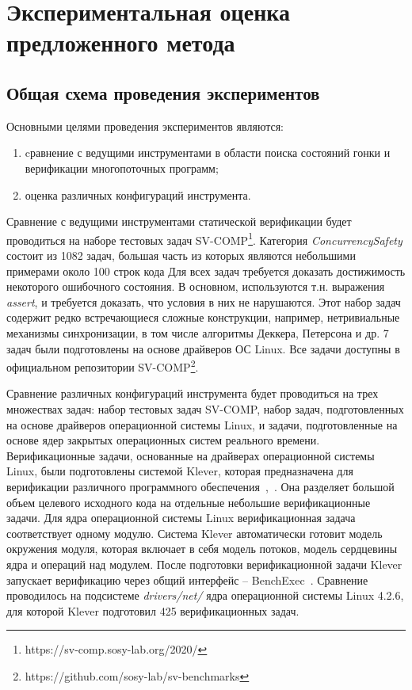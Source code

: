 \chapter{Экспериментальная оценка предложенного метода}
\label{chapter_evaluation}

\newcommand{\theory}{CPALockator-Reach}
\newcommand{\theoryraces}{CPALockator-TM}
\newcommand{\combatmode}{CPALockator-Inv}

\section{Общая схема проведения экспериментов}

Основными целями проведения экспериментов являются:
\begin{enumerate}
\item cравнение с ведущими инструментами в области поиска состояний гонки и верификации многопоточных программ;
\item оценка различных конфигураций инструмента.
\end{enumerate}

Сравнение с ведущими инструментами статической верификации будет проводиться на наборе тестовых задач SV-COMP\footnote{https://sv-comp.sosy-lab.org/2020/}.
Категория {\em ConcurrencySafety} состоит из 1082 задач, большая часть из которых являются небольшими примерами около 100 строк кода
Для всех задач требуется доказать достижимость некоторого ошибочного состояния. 
В основном, используются т.н. выражения \textit{assert}, и требуется доказать, что условия в них не нарушаются. 
Этот набор задач содержит редко встречающиеся сложные конструкции, например, нетривиальные механизмы синхронизации, в том числе алгоритмы Деккера, Петерсона и др.
7 задач были подготовлены на основе драйверов ОС Linux. Все задачи доступны в официальном репозитории SV-COMP\footnote{https://github.com/sosy-lab/sv-benchmarks}.

Сравнение различных конфигураций инструмента будет проводиться на трех множествах задач: набор тестовых задач SV-COMP, набор задач, подготовленных на основе драйверов операционной системы Linux, и задачи, подготовленные на основе ядер закрытых операционных систем реального времени.
Верификационные задачи, основанные на драйверах операционной системы Linux, были подготовлены системой Klever, которая предназначена для верификации различного программного обеспечения~\cite{kleverPsi},~\cite{kleverIsola}.
Она разделяет большой объем целевого исходного кода на отдельные небольшие верификационные задачи.
Для ядра операционной системы Linux верификационная задача соответствует одному модулю.
Система Klever автоматически готовит модель окружения модуля, которая включает в себя модель потоков, модель сердцевины ядра и операций над модулем.
После подготовки верификационной задачи Klever запускает верификацию через общий интерфейс -- BenchExec~\cite{benchexec2019}.
Сравнение проводилось на подсистеме \textit{drivers/net/} ядра операционной системы Linux 4.2.6, для которой Klever подготовил 425 верификационных задач.

